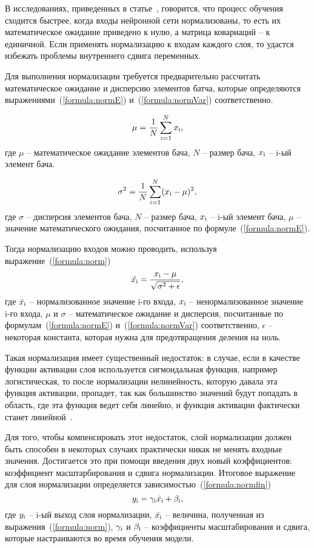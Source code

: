 В исследованиях, приведенных в статье~\cite{normalisation_lecun}, говорится, что процесс обучения сходится быстрее, когда входы нейронной сети нормализованы, то есть их математическое ожидание приведено к нулю, а матрица ковариаций -- к единичной. Если применять нормализацию к входам каждого слоя, то удастся избежать проблемы внутреннего сдвига переменных.

Для выполнения нормализации требуется предварительно рассчитать математическое ожидание и дисперсию элементов батча, которые определяются выражениями~(\ref{formula:normE}) и~(\ref{formula:normVar}) соответственно.

\begin{equation}\label{formula:normE}
\mu = \frac{1}{N} \sum\limits_{i=1}^{N}x_{\rm{i}},
\end{equation}
где $\mu$ -- математическое ожидание элементов бача, $N$ -- размер бача, $x_{\rm{i}}$ -- i-ый элемент бача.

\begin{equation}\label{formula:normVar}
\sigma^2 = \frac{1}{N} \sum\limits_{i=1}^{N}(x_{\rm{i}} - \mu)^2,
\end{equation}
где $\sigma$ -- дисперсия элементов бача, $N$ -- размер бача, $x_{\rm{i}}$ -- i-ый элемент бача, $\mu$ -- значение математического ожидания, посчитанное по формуле~(\ref{formula:normE}).

Тогда нормализацию входов можно проводить, используя выражение~(\ref{formula:norm})
\begin{equation}\label{formula:norm}
\hat{x_{\rm{i}}} = \frac{x_{\rm{i}} - \mu}{\sqrt{\sigma^2 + \epsilon}},
\end{equation}
где $\hat{x_{\rm{i}}}$ -- нормализованное значение i-го входа, $x_{\rm{i}}$ -- ненормализованное значение i-го входа, $\mu$ и $\sigma$ -- математическое ожидание и дисперсия, посчитанные по формулам~(\ref{formula:normE}) и~(\ref{formula:normVar}) соответственно, $\epsilon$ -- некоторая константа, которая нужна для предотвращения деления на ноль.

Такая нормализация имеет существенный недостаток: в случае, если в качестве функции активации слоя используется сигмоидальная функция, например логистическая, то после нормализации нелинейность, которую давала эта функция активации, пропадет, так как большинство значений будут попадать в область, где эта функция ведет себя линейно, и функция активации фактически станет линейной~\cite{normalisation}.

Для того, чтобы компенсировать этот недостаток, слой нормализации должен быть способен в некоторых случаях практически никак не менять входные значения. Достигается это при помощи введения двух новый коэффициентов: коэффициент масштарбирования и сдвига нормализации. Итоговое выражение для слоя нормализации определяется зависимостью~(\ref{formula:normfin})
\begin{equation}\label{formula:normfin}
y_{\rm{i}} = \gamma_{\rm{i}}\hat{x_{\rm{i}}} + \beta_{\rm{i}},
\end{equation}
где $y_{\rm{i}}$ -- i-ый выход слоя нормализации, $\hat{x_{\rm{i}}}$ -- величина, полученная из выражения~(\ref{formula:norm}), $\gamma_{\rm{i}}$ и $\beta_{\rm{i}}$ -- коэффициенты масштабирования и сдвига, которые настраиваются во время обучения модели.

